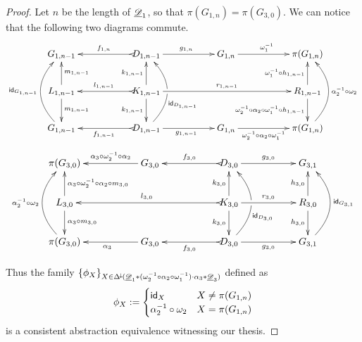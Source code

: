 \begin{proof}
Let $n$ be the length of $\underline{\mathscr{D}}_1$, so that $\pi(G_{1,n})=\pi(G_{3,0})$. We can notice that the following two diagrams commute.
	\[\xymatrix@C=55pt{G_{1, n-1}&D_{1,n-1} \ar[r]^{g_{1,n}} \ar@{>->}[l]_{f_{1,n}}&G_{1,n}  \ar[r]^{\omega^{-1}_1}& \pi(G_{1,n})\\  L_{1,n-1} \ar[u]_{m_{1,n-1}} \ar[d]^{m_{1, n-1}}& K_{1, n-1} \ar[u]^{k_{1,n-1}} \ar[d]_{k_{1,n-1}} \ar[rr]^{r_{1, n-1}} \ar@{>->}[l]_{l_{1,n-1}} &&R_{1, n-1}\ar[u]^{\omega^{-1}_1\circ h_{1,n-1}} \ar[d]_{\omega^{-1}_2\circ \alpha_2\circ \omega^{-1}_1\circ h_{1, n-1}}\\G_{1, n-1} \ar@/^.80cm/[uu]^{\id{G_{1, n-1}}}&D_{1, n-1}\ar@{>->}[l]^{f_{1, n-1}}\ar@/_.80cm/[uu]_(.35){\id{D_{1, n-1}}}|\hole \ar[r]_{g_{1, n-1}}&G_{1, n}\ar[r]_-{\omega^{-1}_2\circ \alpha_2\circ \omega^{-1}_1}& \pi(G_{1, n})\ar@/_.80cm/[uu]_{\alpha^{-1}_2\circ \omega_2}}\]
		\[\xymatrix@C=55pt{\pi(G_{3, 0}) & G_{3,0}  \ar[l]_-{\alpha_3\circ \omega^{-1}_2\circ \alpha_2}&D_{3,0} \ar[r]^{g_{3,0}} \ar@{>->}[l]_{f_{3,0}}&G_{3,1}  \\  L_{3,0} \ar[u]_{\alpha_3\circ \omega^{-1}_2\circ \alpha_2\circ m_{3,0}} \ar[d]^{\alpha_3\circ  m_{3, 0}}& & K_{3, 0} \ar[u]^{k_{3,0}} \ar[d]_{k_{3,0}} \ar[r]^{r_{3, 0}} \ar@{>->}[ll]_{l_{3,0}} &R_{3, 0}\ar[u]^{ h_{3,0}} \ar[d]_{ h_{3, 0}}\\\pi(G_{3, 0})  \ar@/^.80cm/[uu]^{\alpha^{-1}_2\circ \omega_2}&G_{3,0} \ar[l]^{\alpha_3}&D_{3, 0}\ar@{>->}[l]^{f_{3, 0}}\ar@/_.80cm/[uu]_(.35){\id{D_{3, 0}}}|\hole \ar[r]_{g_{3, 0}}&G_{3, 1}\ar@/_.80cm/[uu]_{\id{G_{3,1}}}}\]
	
Thus the family $\{\phi_{X}\}_{X\in \Delta^{\hspace{-1pt}\downarrow\hspace{-1pt}}(\underline{\mathscr{D}}_1*(\omega^{-1}_2\circ \alpha_2\circ \omega^{-1}_1)\cdot \alpha_3*\underline{\mathscr{D}}_3)}$ defined as
\[\phi_X:=\begin{cases}
	\mathsf{id}_{X} & X\neq \pi(G_{1,n})\\
	\alpha^{-1}_2 \circ \omega_2 & X= \pi(G_{1,n})
\end{cases}\]
is a consistent abstraction equivalence witnessing our thesis.




\end{proof}
